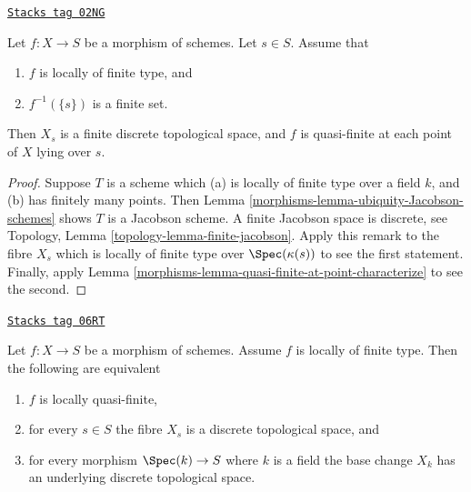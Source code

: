 \begin{lemma}
\label{morphisms-lemma-finite-fibre}
\href{https://stacks.math.columbia.edu/tag/02NG}{\texttt{Stacks tag 02NG}}

Let $f : X \to S$ be a morphism of schemes.
Let $s \in S$. Assume that
\begin{enumerate}
\item $f$ is locally of finite type, and
\item $f^{-1}(\{s\})$ is a finite set.
\end{enumerate}
Then $X_s$ is a finite discrete topological space, and
$f$ is quasi-finite at each point of $X$ lying over $s$.
\end{lemma}

\begin{proof}

Suppose $T$ is a scheme which (a) is locally of finite type
over a field $k$, and (b) has finitely many points. Then
Lemma \ref{morphisms-lemma-ubiquity-Jacobson-schemes} shows $T$ is a
Jacobson scheme. A finite Jacobson space is discrete, see
Topology, Lemma \ref{topology-lemma-finite-jacobson}.
Apply this remark to the fibre $X_s$ which is locally of finite type over
$\Spec(\kappa(s))$ to see the first statement. Finally, apply
Lemma \ref{morphisms-lemma-quasi-finite-at-point-characterize} to see the second.
\end{proof}

\begin{lemma}
\label{morphisms-lemma-locally-quasi-finite-fibres}
\href{https://stacks.math.columbia.edu/tag/06RT}{\texttt{Stacks tag 06RT}}


Let $f : X \to S$ be a morphism of schemes.
Assume $f$ is locally of finite type.
Then the following are equivalent
\begin{enumerate}
\item $f$ is locally quasi-finite,
\item for every $s \in S$ the fibre $X_s$ is a discrete topological space, and
\item for every morphism $\Spec(k) \to S$ where $k$ is a field
the base change $X_k$ has an underlying discrete topological space.
\end{enumerate}
\end{lemma}


